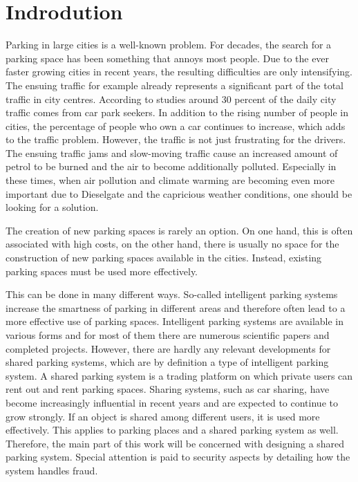 \documentclass[
a4paper,     %
titlepage,   %
14pt         %
]{scrartcl}  %
\theoremstyle{mystyle}
\begin{document}
\section{Indrodution}

Parking in large cities is a well-known problem. For decades, the search for a parking space has been something that annoys most people. Due to the ever faster growing cities in recent years, the resulting difficulties are only intensifying. The ensuing traffic for example already represents a significant part of the total traffic in city centres. According to studies around 30 percent of the daily city traffic comes from car park seekers.\cite{shoup2006cruising} In addition to the rising number of people in cities, the percentage of people who own a car continues to increase, which adds to the traffic problem. However, the traffic is not just frustrating for the drivers. The ensuing traffic jams and slow-moving traffic cause an increased amount of petrol to be burned and the air to become additionally polluted. Especially in these times, when air pollution and climate warming are becoming even more important due to Dieselgate and the capricious weather conditions, one should be looking for a solution.

The creation of new parking spaces is rarely an option. On one hand, this is often associated with high costs, on the other hand, there is usually no space for the construction of new parking spaces available in the cities. Instead, existing parking spaces must be used more effectively.

This can be done in many different ways. So-called intelligent parking systems increase the smartness of parking in different areas and therefore often lead to a more effective use of parking spaces. Intelligent parking systems are available in various forms and for most of them there are numerous scientific papers and completed projects. However, there are hardly any relevant developments for shared parking systems, which are by definition a type of intelligent parking system. A shared parking system is a trading platform on which private users can rent out and rent parking spaces. Sharing systems, such as car sharing, have become increasingly influential in recent years and are expected to continue to grow strongly. If an object is shared among different users, it is used more effectively. This applies to parking places and a shared parking system as well. Therefore, the main part of this work will be concerned with designing a shared parking system. Special attention is paid to security aspects by detailing how the system handles fraud.
\end{document}

